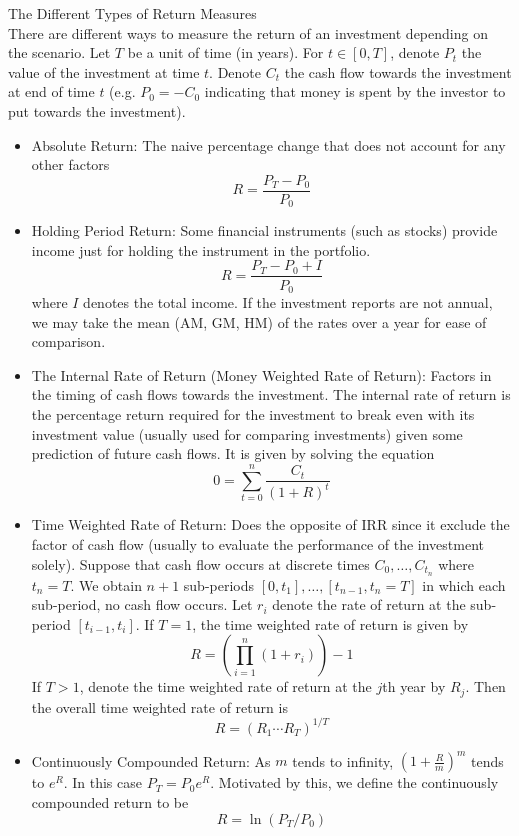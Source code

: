 \documentclass[a4paper]{article}
\begin{document}
\begin{cpt}{The Different Types of Return Measures}{}\\
There are different ways to measure the return of an investment depending on the scenario. Let $T$ be a unit of time (in years). For $t\in[0,T]$, denote $P_t$ the value of the investment at time $t$. Denote $C_t$ the cash flow towards the investment at end of time $t$ (e.g. $P_0=-C_0$ indicating that money is spent by the investor to put towards the investment). 
\begin{itemize}
\item Absolute Return: The naive percentage change that does not account for any other factors $$R=\frac{P_T-P_0}{P_0}$$
\item Holding Period Return: Some financial instruments (such as stocks) provide income just for holding the instrument in the portfolio. $$R=\frac{P_T-P_0+I}{P_0}$$ where $I$ denotes the total income. If the investment reports are not annual, we may take the mean (AM, GM, HM) of the rates over a year for ease of comparison. 
\item The Internal Rate of Return (Money Weighted Rate of Return): Factors in the timing of cash flows towards the investment. The internal rate of return is the percentage return required for the investment to break even with its investment value (usually used for comparing investments) given some prediction of future cash flows. It is given by solving the equation $$0=\sum_{t=0}^n\frac{C_t}{(1+R)^t}$$
\item Time Weighted Rate of Return: Does the opposite of IRR since it exclude the factor of cash flow (usually to evaluate the performance of the investment solely). Suppose that cash flow occurs at discrete times $C_0,\dots,C_{t_n}$ where $t_n=T$. We obtain $n+1$ sub-periods $[0,t_1],\dots,[t_{n-1},t_n=T]$ in which each sub-period, no cash flow occurs. Let $r_i$ denote the rate of return at the sub-period $[t_{i-1},t_i]$. If $T=1$, the time weighted rate of return is given by $$R=\left(\prod_{i=1}^n(1+r_i)\right)-1$$ If $T>1$, denote the time weighted rate of return at the $j$th year by $R_j$. Then the overall time weighted rate of return is $$R=\left(R_1\cdots R_T\right)^{1/T}$$
\item Continuously Compounded Return: As $m$ tends to infinity, $\left(1+\frac{R}{m}\right)^m$ tends to $e^R$. In this case $P_T=P_0e^R$. Motivated by this, we define the continuously compounded return to be $$R=\ln(P_T/P_0)$$ 
\end{itemize}
\end{cpt}
\end{document}
